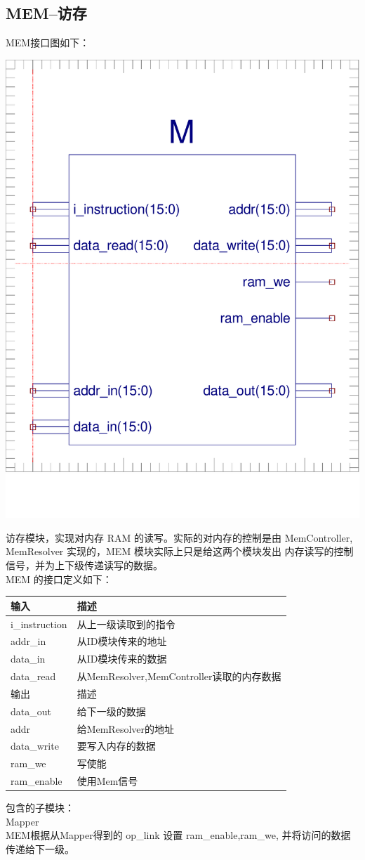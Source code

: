 \documentclass[10pt]{article}
\begin{document}
\begin{CJK}{UTF8}{gbsn}
\subsection{MEM--访存}
MEM接口图如下：\\
\begin{center}
\includegraphics[width=0.5\linewidth]{MEM.pdf}
\end{center}
访存模块，实现对内存 RAM 的读写。实际的对内存的控制是由 MemController, MemResolver 实现的，MEM 模块实际上只是给这两个模块发出
内存读写的控制信号，并为上下级传递读写的数据。\\
MEM 的接口定义如下：\\
\begin{center}
\begin{tabular}{|l|l|}\hline
输入&描述\\\hline
i\_instruction&从上一级读取到的指令\\\hline
addr\_in&从ID模块传来的地址\\\hline
data\_in&从ID模块传来的数据\\\hline
data\_read&从MemResolver,MemController读取的内存数据\\\hline\hline
输出&描述\\\hline
data\_out& 给下一级的数据\\\hline
addr&给MemResolver的地址\\\hline
data\_write& 要写入内存的数据\\\hline
ram\_we&写使能\\\hline
ram\_enable&使用Mem信号\\\hline
\end{tabular}
\end{center}

包含的子模块：\\
Mapper\\
MEM根据从Mapper得到的 op\_link 设置 ram\_enable,ram\_we, 并将访问的数据传递给下一级。


\end{CJK}
\end{document}
